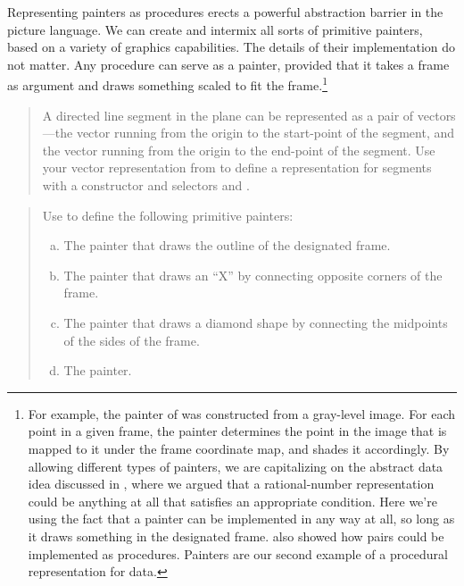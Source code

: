 Representing painters as procedures erects a powerful abstraction barrier in
the picture language.  We can create and intermix all sorts of primitive
painters, based on a variety of graphics capabilities. The details of their
implementation do not matter.  Any procedure can serve as a painter, provided
that it takes a frame as argument and draws something scaled to fit the
frame.\footnote{For example, the  painter of  was
constructed from a gray-level image.  For each point in a given frame, the
 painter determines the point in the image that is mapped to it
under the frame coordinate map, and shades it accordingly.  By allowing
different types of painters, we are capitalizing on the abstract data idea
discussed in , where we argued that a rational-number
representation could be anything at all that satisfies an appropriate
condition.  Here we're using the fact that a painter can be implemented in any
way at all, so long as it draws something in the designated frame.
 also showed how pairs could be implemented as procedures.  Painters
are our second example of a procedural representation for data.}

\begin{quote}
 A directed line segment in the
plane can be represented as a pair of vectors---the vector running from the
origin to the start-point of the segment, and the vector running from the
origin to the end-point of the segment.  Use your vector representation from
 to define a representation for segments with a constructor
 and selectors  and .
\end{quote}

\begin{quote}
 Use 
to define the following primitive painters:

\begin{enumerate}[a.]

\item
The painter that draws the outline of the designated frame.

\item
The painter that draws an ``X'' by connecting opposite corners of the frame.

\item
The painter that draws a diamond shape by connecting the midpoints of the sides
of the frame.

\item
The  painter.

\end{enumerate}
\end{quote}

